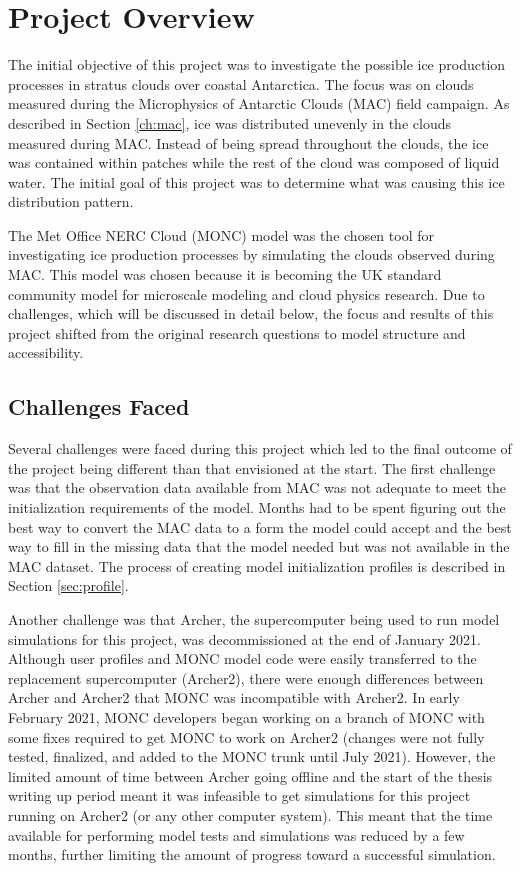 \section{Project Overview} \label{ch:method}
The initial objective of this project was to investigate the possible ice production processes in stratus clouds over coastal Antarctica. The focus was on clouds measured during the Microphysics of Antarctic Clouds (MAC) field campaign. As described in Section \ref{ch:mac}, ice was distributed unevenly in the clouds measured during MAC. Instead of being spread throughout the clouds, the ice was contained within patches while the rest of the cloud was composed of liquid water. \citep{oshea2017} The initial goal of this project was to determine what was causing this ice distribution pattern. 

The Met Office NERC Cloud (MONC) model was the chosen tool for investigating ice production processes by simulating the clouds observed during MAC. This model was chosen because it is becoming the UK standard community model for microscale modeling and cloud physics research. Due to challenges, which will be discussed in detail below, the focus and results of this project shifted from the original research questions to model structure and accessibility.
\newpage
\subsection{Challenges Faced}
Several challenges were faced during this project which led to the final outcome of the project being different than that envisioned at the start. The first challenge was that the observation data available from MAC was not adequate to meet the initialization requirements of the model. Months had to be spent figuring out the best way to convert the MAC data to a form the model could accept and the best way to fill in the missing data that the model needed but was not available in the MAC dataset. The process of creating model initialization profiles is described in Section \ref{sec:profile}.

Another challenge was that Archer, the supercomputer being used to run model simulations for this project, was decommissioned at the end of January 2021. Although user profiles and MONC model code were easily transferred to the replacement supercomputer (Archer2), there were enough differences between Archer and Archer2 that MONC was incompatible with Archer2. In early February 2021, MONC developers began working on a branch of MONC with some fixes required to get MONC to work on Archer2 (changes were not fully tested, finalized, and added to the MONC trunk until July 2021). However, the limited amount of time between Archer going offline and the start of the thesis writing up period meant it was infeasible to get simulations for this project running on Archer2 (or any other computer system). This meant that the time available for performing model tests and simulations was reduced by a few months, further limiting the amount of progress toward a successful simulation.

